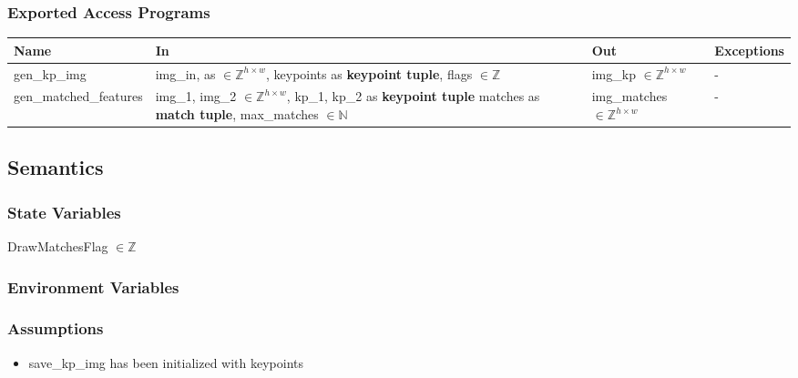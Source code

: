 \documentclass[12pt, titlepage]{article}
\begin{document}
\subsubsection{Exported Access Programs}
\begin{center}
\begin{tabular}{p{4cm} p{5cm} p{4cm} p{2cm}}
\hline
\textbf{Name} & \textbf{In} & \textbf{Out} & \textbf{Exceptions} \\
\hline
gen\_kp\_img & img\_in, as $\in \mathbb{Z}^{h \times w}$, \newline
keypoints as \textbf{keypoint tuple}, \newline
flags $\in \mathbb{Z}$ & img\_kp $\in \mathbb{Z}^{h \times w}$ & - \\
\hline
gen\_matched\_features 
& img\_1, img\_2 $\in \mathbb{Z}^{h \times w}$, \newline
kp\_1, kp\_2 as \textbf{keypoint tuple} \newline
matches as \textbf{match tuple}, \newline 
max\_matches $\in \mathbb{N}$
& img\_matches $\in \mathbb{Z}^{h \times w}$ & - \\
\hline
\end{tabular}
\end{center}

\subsection{Semantics}

\subsubsection{State Variables}

DrawMatchesFlag $\in \mathbb{Z}$

\subsubsection{Environment Variables}


\subsubsection{Assumptions}
\begin{itemize}
  \item save\_kp\_img has been initialized with keypoints
\end{itemize}
\end{document}
